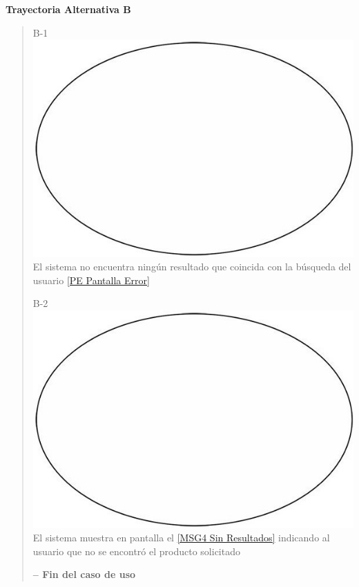 \documentclass[14pt]{article}
\begin{document}
                \vspace{0.5cm}\textbf{Trayectoria Alternativa B}\label{CU-1.2 Trayectoria Alternativa B}
                    \begin{quote}
                        \item B-1 \includegraphics[height=0.02\textwidth]{Sistema.jpg}
                            \label{Sistema} El sistema no encuentra ningún resultado que coincida con la búsqueda del usuario \ref{PE Pantalla Error}
                        \item B-2 \includegraphics[height=0.02\textwidth]{Sistema.jpg}
                            \label{Sistema} El sistema muestra en pantalla el \ref{MSG4 Sin Resultados} indicando al usuario que no se encontró el producto solicitado
                        
                        \vspace{0.3cm}\textbf{-- Fin del caso de uso}
                    \end{quote}
                 
            \newpage 
\end{document}
